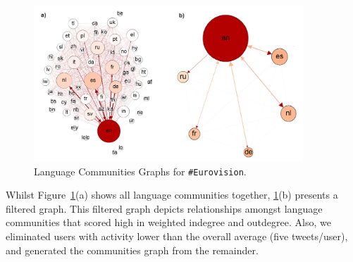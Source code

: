 \documentclass{llncs}
\begin{document}
\begin{figure}[htb]
\centering
\includegraphics[width=0.9\textwidth]{images/communitiesgraphs.png}
\caption{Language Communities Graphs for {\texttt{\#Eurovision}}.}
\label{fig:communitiesgraphs}
\end{figure}

Whilst Figure~\ref{fig:communitiesgraphs}(a) shows all language
communities together, \ref{fig:communitiesgraphs}(b) presents a
filtered graph. This filtered graph depicts relationships amongst
language communities that scored high in weighted indegree and
outdegree. Also, we eliminated users with activity lower than the
overall average (five tweets/user), and generated the communities
graph from the remainder.





\end{document}
